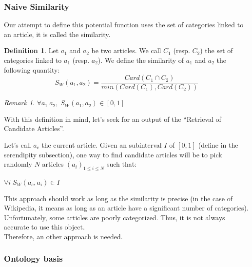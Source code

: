 \documentclass[11pt]{article}
\theoremstyle{plain}
\theoremstyle{definition}
\newtheorem{defn}{Definition}[section]
\theoremstyle{remark}
\newtheorem*{rem}{Remark}
\begin{document}
\subsubsection{Naive Similarity}

Our attempt to define this potential function uses the set of categories linked to an article, it is called the similarity.





\vspace*{5mm}
\begin{defn}
  Let $a_1$ and $a_2$ be two articles. We call $C_1$ (resp. $C_2$) the set of categories linked to $a_1$ (resp. $a_2$).
  We define the similarity of $a_1$ and $a_2$ the following quantity:\\
  \begin{equation*}
    S_W(a_1,a_2) = \frac{Card(C_1 \cap C_2)}{min(Card(C_1),Card(C_2))}
  \end{equation*}
\end{defn}

\begin{rem}
  $\forall a_1\: a_2,\; S_W(a_1,a_2) \in [0,1]$
\end{rem}

\vspace*{5mm}
With this definition in mind, let's seek for an output of the ``Retrieval of Candidate Articles''.


Let's call $a_c$ the current article.
Given an subinterval $I$ of $[0,1]$ (define in the serendipity subsection), one way to find candidate articles will be to pick randomly $N$ articles $(a_i)_{1 \leq i \leq N}$ such that:
\begin{center}
  $\forall i \; S_W(a_c,a_i) \in I$
\end{center}

\vspace*{5mm}
This approach should work as long as the similarity is precise (in the case of Wikipedia, it means as long as an article have a significant number of categories). Unfortunately, some articles are poorly categorized. Thus, it is not always accurate to use this object.\\
Therefore, an other approach is needed.






\subsubsection{Ontology basis}
\end{document}
